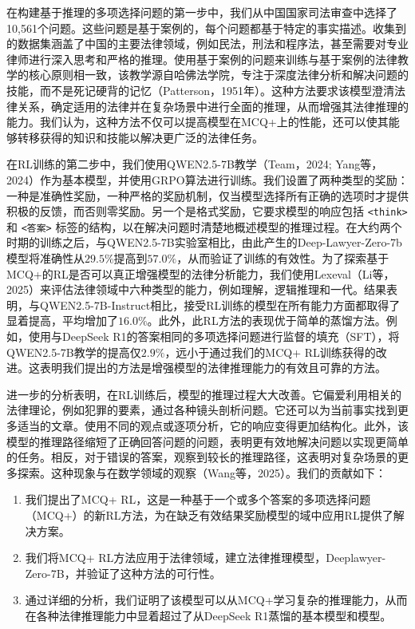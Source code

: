 \documentclass{pkuthesis}
\begin{document}
在构建基于推理的多项选择问题的第一步中，我们从中国国家司法审查中选择了10,561个问题。这些问题是基于案例的，每个问题都基于特定的事实描述。收集到的数据集涵盖了中国的主要法律领域，例如民法，刑法和程序法，甚至需要对专业律师进行深入思考和严格的推理。使用基于案例的问题来训练与基于案例的法律教学的核心原则相一致，该教学源自哈佛法学院，专注于深度法律分析和解决问题的技能，而不是死记硬背的记忆（Patterson，1951年）。这种方法要求该模型澄清法律关系，确定适用的法律并在复杂场景中进行全面的推理，从而增强其法律推理的能力。我们认为，这种方法不仅可以提高模型在MCQ+上的性能，还可以使其能够转移获得的知识和技能以解决更广泛的法律任务。

在RL训练的第二步中，我们使用QWEN2.5-7B教学（Team，2024; Yang等，2024）作为基本模型，并使用GRPO算法进行训练。我们设置了两种类型的奖励：一种是准确性奖励，一种严格的奖励机制，仅当模型选择所有正确的选项时才提供积极的反馈，而否则零奖励。另一个是格式奖励，它要求模型的响应包括 \texttt{<think>} 和 \texttt{<答案>} 标签的结构，以在解决问题时清楚地概述模型的推理过程。在大约两个时期的训练之后，与QWEN2.5-7B实验室相比，由此产生的Deep-Lawyer-Zero-7b模型将准确性从$29.5\%$提高到$57.0\%$，从而验证了训练的有效性。为了探索基于MCQ+的RL是否可以真正增强模型的法律分析能力，我们使用Lexeval（Li等，2025）来评估法律领域中六种类型的能力，例如理解，逻辑推理和一代。结果表明，与QWEN2.5-7B-Instruct相比，接受RL训练的模型在所有能力方面都取得了显着提高，平均增加了$16.0\%$。此外，此RL方法的表现优于简单的蒸馏方法。例如，使用与DeepSeek R1的答案相同的多项选择问题进行监督的填充（SFT），将QWEN2.5-7B教学的提高仅$2.9\%$，远小于通过我们的MCQ+ RL训练获得的改进。这表明我们提出的方法是增强模型的法律推理能力的有效且可靠的方法。

进一步的分析表明，在RL训练后，模型的推理过程大大改善。它偏爱利用相关的法律理论，例如犯罪的要素，通过各种镜头剖析问题。它还可以为当前事实找到更多适当的文章。使用不同的观点或逐项分析，它的响应变得更加结构化。此外，该模型的推理路径缩短了正确回答问题的问题，表明更有效地解决问题以实现更简单的任务。相反，对于错误的答案，观察到较长的推理路径，这表明对复杂场景的更多探索。这种现象与在数学领域的观察（Wang等，2025）。我们的贡献如下：
\begin{enumerate}
    \item 我们提出了MCQ+ RL，这是一种基于一个或多个答案的多项选择问题（MCQ+）的新RL方法，为在缺乏有效结果奖励模型的域中应用RL提供了解决方案。
    \item 我们将MCQ+ RL方法应用于法律领域，建立法律推理模型，Deeplawyer-Zero-7B，并验证了这种方法的可行性。
    \item 通过详细的分析，我们证明了该模型可以从MCQ+学习复杂的推理能力，从而在各种法律推理能力中显着超过了从DeepSeek R1蒸馏的基本模型和模型。
\end{enumerate}
\end{document}
